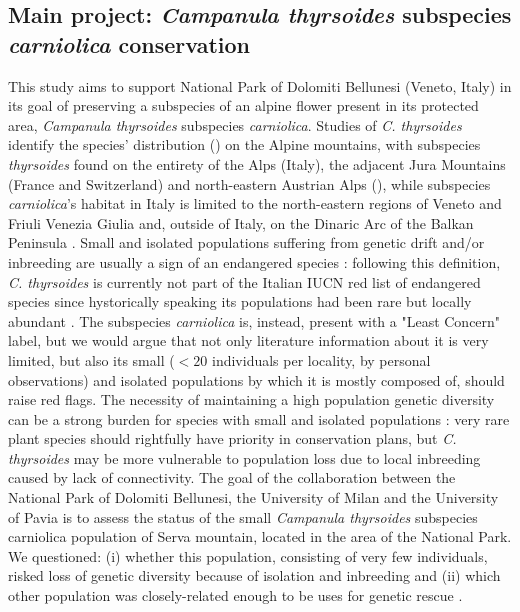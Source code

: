 \documentclass[a4paper, 12pt]{report}
\begin{document}
\subsection{Main project: \textit{Campanula thyrsoides} subspecies \textit{carniolica} conservation}
This study aims to support National Park of Dolomiti Bellunesi (Veneto, Italy) in its goal of preserving a subspecies of an alpine flower present in its protected area, \textit{Campanula thyrsoides} subspecies \textit{carniolica}. Studies of \textit{C. thyrsoides} identify the species' distribution (\cite{aegisdottirIsolatedPopulationsRare2009}) on the Alpine mountains, with subspecies \textit{thyrsoides} found on the entirety of the Alps (Italy), the adjacent Jura Mountains (France and Switzerland) and north-eastern Austrian Alps (\cite{scheepensDifferentiationMorphologyFlowering2011}), while subspecies \textit{carniolica}'s habitat in Italy is limited to the north-eastern regions of Veneto and Friuli Venezia Giulia \parencite{fabiocontiAnnotatedChecklistItalian2005} and, outside of Italy, on the Dinaric Arc of the Balkan Peninsula \parencite{kussBiologicalFloraCentral2007}.  Small and isolated populations suffering from genetic drift and/or inbreeding are usually a sign of an endangered species \parencite{volisQuasiSituBridge2010}: following this definition, \textit{C. thyrsoides} is currently not part of the Italian IUCN red list of endangered species \parencite{grazianorossiListaRossaFlora2020} since hystorically speaking its populations had been rare but locally abundant \parencite{aegisdottirIsolatedPopulationsRare2009}. The subspecies \textit{carniolica} is, instead, present with a "Least Concern" label, but we would argue that not only literature information about it is very limited, but also its small ($<20$ individuals per locality, by personal observations) and isolated populations by which it is mostly composed of, should raise red flags. The necessity of maintaining a high population genetic diversity can be a strong burden for species with small and isolated populations \parencite{habelBurdenGeneticDiversity2012}: very rare plant species should rightfully have priority in conservation plans, but \textit{C. thyrsoides} may be more vulnerable to population loss due to local inbreeding caused by lack of connectivity. The goal of the collaboration between the National Park of Dolomiti Bellunesi, the University of Milan and the University of Pavia is to assess the status of the small \textit{Campanula thyrsoides} subspecies {carniolica} population of Serva mountain, located in the area of the National Park. We questioned: (i) whether this population, consisting of very few individuals, risked loss of genetic diversity because of isolation and inbreeding and (ii) which other population was closely-related enough to be uses for genetic rescue \parencite{suppleConservationBiodiversityGenomics2018}. 
\end{document}
